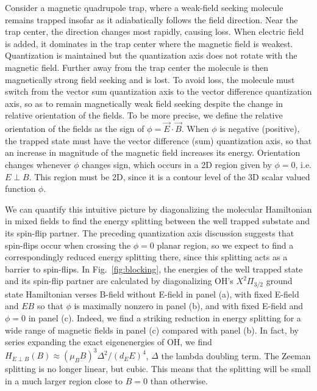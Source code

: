 \documentclass[%
 reprint,
groupedaddress,
 amsmath,amssymb,
 aps,
prl,
]{revtex4-1}
\newcommand{\epb}{{$E\!\perp\!B$}}
\newcommand{\epbm}{{E\!\perp\!B}}
\begin{document}

Consider a magnetic quadrupole trap, where a weak-field seeking molecule remains trapped insofar as it adiabatically follows the field direction. Near the trap center, the direction changes most rapidly, causing loss. When electric field is added, it dominates in the trap center where the magnetic field is weakest. Quantization is maintained but the quantization axis does not rotate with the magnetic field. Further away from the trap center the molecule is then magnetically strong field seeking and is lost. To avoid loss, the molecule must switch from the vector sum quantization axis to the vector difference quantization axis, so as to remain magnetically weak field seeking despite the change in relative orientation of the fields. To be more precise, we define the relative orientation of the fields as the sign of $\phi=\vec{E}\cdot\vec{B}$. When $\phi$ is negative (positive), the trapped state must have the vector difference (sum) quantization axis, so that an increase in magnitude of the magnetic field increases its energy. Orientation changes whenever $\phi$ changes sign, which occurs in a 2D region given by $\phi=0$, i.e. \epb. This region must be 2D, since it is a contour level of the 3D scalar valued function $\phi$. 


We can quantify this intuitive picture by diagonalizing the molecular Hamiltonian in mixed fields to find the energy splitting between the well trapped substate and its spin-flip partner. The preceding quantization axis discussion suggests that spin-flips occur when crossing the $\phi=0$ planar region, so we expect to find a correspondingly reduced energy splitting there, since this splitting acts as a barrier to spin-flips. In Fig.~\ref{fig:blocking}, the energies of the well trapped state and its spin-flip partner are calculated by diagonalizing OH's $X^2\Pi_{3/2}$ ground state Hamiltonian verses B-field without E-field  in panel (a), with fixed E-field and $E$\raisebox{1px}{$\parallel$}$B$ so that $\phi$ is maximally nonzero in panel (b), and with fixed E-field and $\phi=0$ in panel (c). Indeed, we find a striking reduction in energy splitting for a wide range of magnetic fields in panel (c) compared with panel (b). In fact, by series expanding the exact eigenenergies of OH, we find $H_\epbm(B)\approx (\mu_BB)^3\Delta^2/(d_EE)^4$, $\Delta$ the lambda doubling term. The Zeeman splitting is no longer linear, but cubic. This means that the splitting will be small in a much larger region close to $B=0$ than otherwise.
\end{document}
